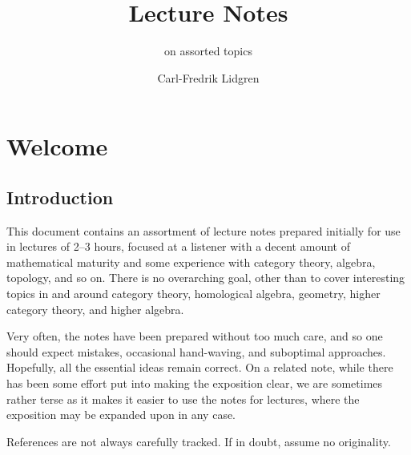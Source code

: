\documentclass[a4paper, 11pt]{article}
\title{Lecture Notes}
\author{on assorted topics}
\date{Carl-Fredrik Lidgren}
\newcommand{\1}{\ensuremath{\mathbb{1}}}
\newcommand{\2}{\ensuremath{\mathbb{2}}}
\newcommand{\3}{\ensuremath{\mathbb{3}}}
\begin{document}
\maketitle


\tableofcontents

\clearpage
\setcounter{section}{-1}
\section{Welcome}
\subsection{Introduction}
This document contains an assortment of lecture notes prepared initially for use in lectures of 2--3 hours, focused at a listener with a decent amount of mathematical
maturity and some experience with category theory, algebra, topology, and so on. There is no overarching goal, other than to cover interesting topics in and around category
theory, homological algebra, geometry, higher category theory, and higher algebra.

Very often, the notes have been prepared without too much care, and so one should expect mistakes, occasional hand-waving, and suboptimal approaches. Hopefully, all the essential ideas
remain correct. On a related note, while there has been some effort put into making the exposition clear, we are sometimes rather terse as it makes it easier to use the notes
for lectures, where the exposition may be expanded upon in any case.

References are not always carefully tracked. If in doubt, assume no originality.
\end{document}
